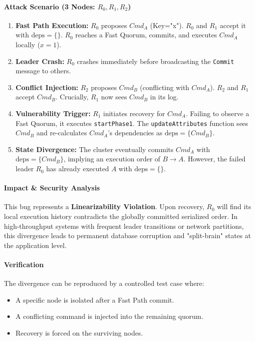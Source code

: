 \documentclass{article}
\theoremstyle{plain}
\theoremstyle{definition}
\theoremstyle{remark}
\begin{document}
{\paragraph{Attack Scenario (3 Nodes: $R_0, R_1, R_2$)}
\begin{enumerate}
    \item \textbf{Fast Path Execution:} $R_0$ proposes $Cmd_A$ (Key="x"). $R_0$ and $R_1$ accept it with $\text{deps}=\{\}$. $R_0$ reaches a Fast Quorum, commits, and executes $Cmd_A$ locally ($x=1$).
    \item \textbf{Leader Crash:} $R_0$ crashes immediately before broadcasting the \texttt{Commit} message to others.
    \item \textbf{Conflict Injection:} $R_2$ proposes $Cmd_B$ (conflicting with $Cmd_A$). $R_2$ and $R_1$ accept $Cmd_B$. Crucially, $R_1$ now sees $Cmd_B$ in its log.
    \item \textbf{Vulnerability Trigger:} $R_1$ initiates recovery for $Cmd_A$. Failing to observe a Fast Quorum, it executes \texttt{startPhase1}. The \texttt{updateAttributes} function sees $Cmd_B$ and re-calculates $Cmd_A$'s dependencies as $\text{deps}=\{Cmd_B\}$.
    \item \textbf{State Divergence:} The cluster eventually commits $Cmd_A$ with $\text{deps}=\{Cmd_B\}$, implying an execution order of $B \rightarrow A$. However, the failed leader $R_0$ has already executed $A$ with $\text{deps}=\{\}$.
\end{enumerate}

\paragraph{Impact \& Security Analysis}
This bug represents a \textbf{Linearizability Violation}. Upon recovery, $R_0$ will find its local execution history contradicts the globally committed serialized order. In high-throughput systems with frequent leader transitions or network partitions, this divergence leads to permanent database corruption and "split-brain" states at the application level.

\paragraph{Verification}
The divergence can be reproduced by a controlled test case where:
\begin{itemize}
    \item A specific node is isolated after a Fast Path commit.
    \item A conflicting command is injected into the remaining quorum.
    \item Recovery is forced on the surviving nodes.
\end{itemize}
}
\end{document}

